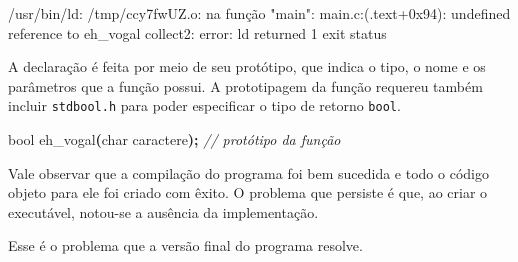 \documentclass[
  11pt,
  a4paper,
]{scrbook}
\newenvironment{Shaded}{\begin{snugshade}}{\end{snugshade}}
\newcommand{\CommentTok}[1]{\textcolor[rgb]{0.56,0.35,0.01}{\textit{#1}}}
\newcommand{\DataTypeTok}[1]{\textcolor[rgb]{0.13,0.29,0.53}{#1}}
\newcommand{\NormalTok}[1]{#1}
\newcommand{\OperatorTok}[1]{\textcolor[rgb]{0.81,0.36,0.00}{\textbf{#1}}}
\begin{document}
\begin{Shaded}
\begin{Highlighting}[]
\NormalTok{/usr/bin/ld: /tmp/ccy7fwUZ.o: na função "main":}
\NormalTok{main.c:(.text+0x94): undefined reference to \textasciigrave{}eh\_vogal\textquotesingle{}}
\NormalTok{collect2: error: ld returned 1 exit status}
\end{Highlighting}
\end{Shaded}

A declaração é feita por meio de seu protótipo, que indica o tipo, o
nome e os parâmetros que a função possui. A prototipagem da função
requereu também incluir \texttt{stdbool.h} para poder especificar o tipo
de retorno \texttt{bool}.

\begin{Shaded}
\begin{Highlighting}[]
\DataTypeTok{bool}\NormalTok{ eh\_vogal}\OperatorTok{(}\DataTypeTok{char}\NormalTok{ caractere}\OperatorTok{);}  \CommentTok{// protótipo da função}
\end{Highlighting}
\end{Shaded}

Vale observar que a compilação do programa foi bem sucedida e todo o
código objeto para ele foi criado com êxito. O problema que persiste é
que, ao criar o executável, notou-se a ausência da implementação.

Esse é o problema que a versão final do programa resolve.
\end{document}
